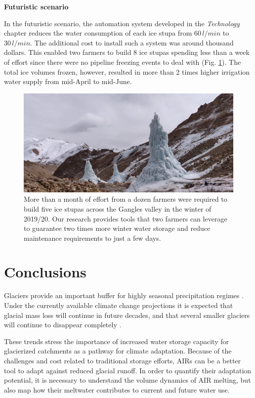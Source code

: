 \textbf{Futuristic scenario}

In the futuristic scenario, the automation system developed in the \textit{Technology} chapter reduces the water
consumption of each ice stupa from $60\,l/min$ to $30\,l/min$. The additional cost to install such a system was
around thousand dollars. This enabled two farmers to build 8 ice stupas spending less than a week of effort
since there were no pipeline freezing events to deal with (Fig. \ref{fig:icestupa_valley}). The total ice
volumes frozen, however, resulted in more than 2 times higher irrigation water supply from mid-April to
mid-June.

\begin{figure}[htb]
	\includegraphics[width=\textwidth]{figs/icestupa_valley}

  \caption{More than a month of effort from a dozen farmers were required to build five ice stupas across the
  Gangles valley in the winter of 2019/20. Our research provides tools that two farmers can leverage to
  guarantee two times more winter water storage and reduce maintenance requirements to just a few days.}

	\label{fig:icestupa_valley}
\end{figure}

\section{Conclusions}

Glaciers provide an important buffer for highly seasonal precipitation regimes
\citep{kaserContributionPotentialGlaciers2010}. Under the currently available climate change projections it is
expected that glacial mass loss will continue in future decades, and that several smaller glaciers will continue
to disappear completely \citep{rabatelCurrentStateGlaciers2013}.

These trends stress the importance of increased water storage capacity for glacierized catchments as a pathway
for climate adaptation. Because of the challenges and cost related to traditional storage efforts, \ac{AIRs} can
be a better tool to adapt against reduced glacial runoff. In order to quantify their adaptation potential, it is
necessary to understand the volume dynamics of AIR melting, but also map how their meltwater contributes to
current and future water use. 

